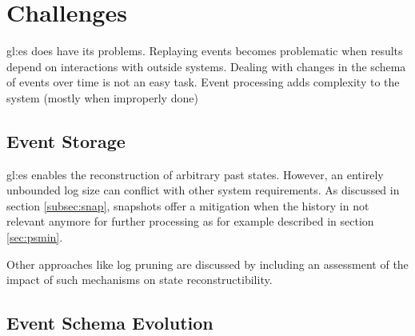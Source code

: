 \section{Challenges}

\gls{gl:es} does have its problems. Replaying events becomes problematic when results depend on interactions with outside systems. Dealing with changes in the schema of events over time is not an easy task. Event processing adds complexity to the system (mostly when improperly done)~\citep{esvsed}

\subsection{Event Storage}

\gls{gl:es} enables the reconstruction of arbitrary past states. However, an entirely unbounded log size can conflict with other system requirements. As discussed in section \ref{subsec:snap}, snapshots offer a mitigation when the history in not relevant anymore for further processing as for example described in section \ref{sec:psmin}.

Other approaches like log pruning are discussed by \citep{10.1145/3210284.3219767} including an assessment of the impact of such mechanisms on state reconstructibility.


\subsection{Event Schema Evolution}


